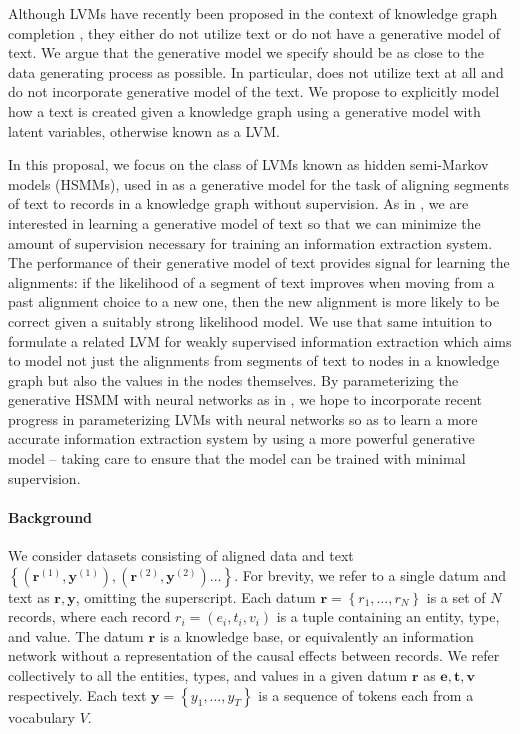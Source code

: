 \documentclass[11pt]{article}
\newcommand\set[1]{\left\{#1\right\}}
\newcommand{\be}{\mathbf{e}}
\newcommand{\br}{\mathbf{r}}
\newcommand{\bt}{\mathbf{t}}
\newcommand{\bv}{\mathbf{v}}
\newcommand{\by}{\mathbf{y}}
\begin{document}
Although LVMs have recently been proposed in the context of knowledge graph
completion \citep{chen2018diva,qu2017ssre}, they either do not utilize text
or do not have a generative model of text.
We argue that the generative model we specify should be as close to 
the data generating process as possible.
In particular, \citet{chen2018diva} does not utilize text at all
and \citet{qu2017ssre} do not incorporate generative model of the text.
We propose to explicitly model how a text is created given a knowledge graph
using a generative model with latent variables, otherwise known as a LVM.

In this proposal, we focus on the class of LVMs known as hidden semi-Markov models (HSMMs),
used in \citet{liang2009semalign} as a generative model for the
task of aligning segments of text to
records in a knowledge graph without supervision.
As in \citet{liang2009semalign}, we are interested in learning a generative model of text so that
we can minimize the amount of supervision necessary for training an information extraction system.
The performance of their generative model of text provides signal for learning the alignments:
if the likelihood of a segment of text improves when moving from a
past alignment choice to a new one,
then the new alignment is more likely to be correct given a suitably strong likelihood model.
We use that same intuition to formulate a related LVM for weakly supervised information extraction
which aims to model not just the alignments from segments of text to nodes in a knowledge graph
but also the values in the nodes themselves.
By parameterizing the generative HSMM with neural networks as in \citet{wiseman2018template},
we hope to incorporate recent progress in parameterizing LVMs with neural networks
so as to learn a more accurate information extraction system by using a more powerful
generative model -- taking care to ensure that the model can be trained with minimal supervision.

\paragraph{Background}
We consider datasets consisting of aligned data and text
$\set{(\br^{(1)}, \by^{(1)}),(\br^{(2)},\by^{(2)})\ldots}$.
For brevity, we refer to a single datum and text as $\br,\by$, omitting the superscript.
Each datum $\br = \set{r_1,\ldots,r_N}$ is a set of $N$ records, where each record $r_i = (e_i, t_i, v_i)$
is a tuple containing an entity, type, and value.
The datum $\br$ is a knowledge base, or equivalently an information network
without a representation of the causal effects between records.
We refer collectively to all the entities, types, and values in a given datum $\br$ as
$\be,\bt,\bv$ respectively.
Each text $\by = \set{y_1,\ldots,y_T}$ is a sequence of tokens each from a vocabulary $V$.
\end{document}
